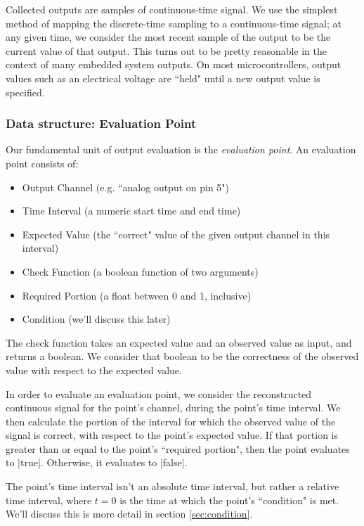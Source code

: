 \documentclass[12pt]{article}
\begin{document}
Collected outputs are samples of continuous-time signal.  We use the simplest method of mapping the discrete-time sampling to a continuous-time signal; at any given time, we consider the most recent sample of the output to be the current value of that output.  This turns out to be pretty reasonable in the context of many embedded system outputs.  On most microcontrollers, output values such as an electrical voltage are ``held" until a new output value is specified.

\subsubsection{Data structure: Evaluation Point}
\label{sec:eval-point}
Our fundamental unit of output evaluation is the \textit{evaluation point}.  An evaluation point consists of:

\begin{itemize}
\item Output Channel (e.g. ``analog output on pin 5")
\item Time Interval (a numeric start time and end time)
\item Expected Value (the ``correct" value of the given output channel in this interval)
\item Check Function (a boolean function of two arguments)
\item Required Portion (a float between 0 and 1, inclusive)
\item Condition (we'll discuss this later)
\end{itemize}

The check function takes an expected value and an observed value as input, and returns a boolean.  We consider that boolean to be the correctness of the observed value with respect to the expected value.

In order to evaluate an evaluation point, we consider the reconstructed continuous signal for the point's channel, during the point's time interval.  We then calculate the portion of the interval for which the observed value of the signal is correct, with respect to the point's expected value.  If that portion is greater than or equal to the point's ``required portion", then the point evaluates to |true|.  Otherwise, it evaluates to |false|.

The point's time interval isn't an absolute time interval, but rather a relative time interval, where $t=0$ is the time at which the point's ``condition" is met.  We'll discuss this is more detail in section \ref{sec:condition}.
\end{document}
